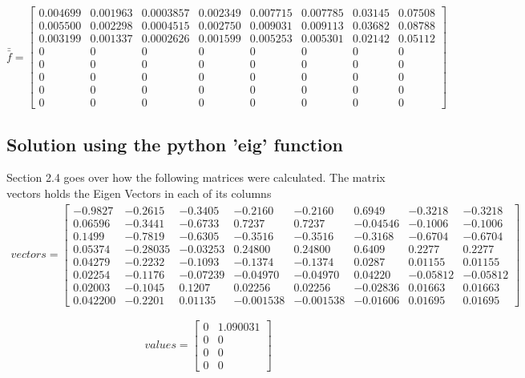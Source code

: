 \documentclass[11pt, oneside]{article}   	%
\begin{document}
$$\bar{\bar{f}} = \begin{bmatrix}
 0.004699 & 0.001963 & 0.0003857 & 0.002349 & 0.007715  & 0.007785
 &  0.03145 & 0.07508\\ 
 0.005500 &  0.002298  & 0.0004515 & 0.002750 & 0.009031   & 0.009113
  & 0.03682 & 0.08788 \\ 
 0.003199 & 0.001337 & 0.0002626 & 0.001599 & 0.005253  & 0.005301
  & 0.02142 & 0.05112 \\ 
 0&0  &0  &0  &0  & 0 & 0 &0 \\ 
0&0  &0  &0  &0  & 0 & 0 &0\\ 
 0&0  &0  &0  &0  & 0 & 0 &0\\ 
 0&0  &0  &0  &0  & 0 & 0 &0 \\ 
 0&0  &0  &0  &0  & 0 & 0 &0
\end{bmatrix}$$

\subsection{Solution using the python 'eig' function}
Section 2.4 goes over how the following matrices were calculated. The matrix vectors holds the Eigen Vectors in each of its columns
\begin{align*}
vectors = \begin{bmatrix}
-0.9827& -0.2615   & -0.3405&
  -0.2160 &-0.2160 & 0.6949
  &-0.3218&-0.3218 \\ 
0.06596&-0.3441&-0.6733&0.7237&  0.7237&  -0.04546 &-0.1006& -0.1006\\ 
 0.1499&-0.7819&-0.6305&-0.3516&-0.3516&-0.3168&-0.6704& -0.6704 \\ 
 0.05374&-0.28035& -0.03253&0.24800& 0.24800&0.6409&0.2277& 0.2277\\ 
0.04279&-0.2232&-0.1093&-0.1374&-0.1374& 0.0287& 0.01155& 0.01155 \\ 
0.02254& -0.1176&-0.07239&-0.04970&-0.04970&0.04220&-0.05812&-0.05812 \\ 
 0.02003&-0.1045&0.1207& 0.02256& 0.02256&-0.02836& 0.01663& 0.01663 \\ 
 0.042200& -0.2201    &  0.01135& -0.001538&-0.001538&-0.01606&0.01695& 0.01695
\end{bmatrix}
\end{align*}

$$values = \begin{bmatrix}
0&1.090031 \\ 
 0&0 \\ 
 0&0 \\ 
 0&0 
\end{bmatrix}$$
\end{document}
